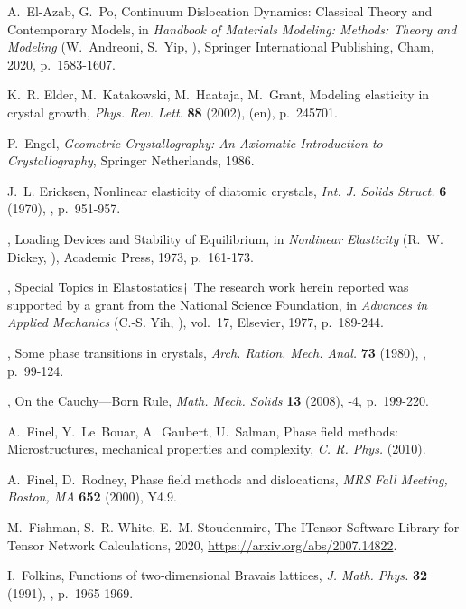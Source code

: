 \documentclass[CRPHYS,Unicode,manuscript]{cedram}
\begin{document}
\begin{thebibliography}{100}
A.~El-Azab, G.~Po, {\og Continuum Dislocation Dynamics: Classical Theory and
  Contemporary Models\fg}, in \emph{Handbook of Materials Modeling: Methods:
  Theory and Modeling} (W.~Andreoni, S.~Yip, \cdredsname), Springer
  International Publishing, Cham, 2020, p.~1583-1607.

K.~R. Elder, M.~Katakowski, M.~Haataja, M.~Grant, {\og Modeling elasticity in
  crystal growth\fg}, \emph{Phys. Rev. Lett.} \textbf{88} (2002), 
  (en), p.~245701.

P.~Engel, \emph{Geometric Crystallography: An Axiomatic Introduction to
  Crystallography}, Springer Netherlands, 1986.

J.~L. Ericksen, {\og Nonlinear elasticity of diatomic crystals\fg}, \emph{Int.
  J. Solids Struct.} \textbf{6} (1970), , p.~951-957.

\bysame , {\og Loading Devices and Stability of Equilibrium\fg}, in
  \emph{Nonlinear Elasticity} (R.~W. Dickey, \cdredname), Academic Press, 1973,
  p.~161-173.

\bysame , {\og Special Topics in {Elastostatics††The} research work herein
  reported was supported by a grant from the National Science Foundation\fg},
  in \emph{Advances in Applied Mechanics} (C.-S. Yih, \cdredname), vol.~17,
  Elsevier, 1977, p.~189-244.

\bysame , {\og Some phase transitions in crystals\fg}, \emph{Arch. Ration.
  Mech. Anal.} \textbf{73} (1980), , p.~99-124.

\bysame , {\og On the {Cauchy---Born} Rule\fg}, \emph{Math. Mech. Solids}
  \textbf{13} (2008), -4, p.~199-220.

A.~Finel, Y.~Le~Bouar, A.~Gaubert, U.~Salman, {\og Phase field methods:
  Microstructures, mechanical properties and complexity\fg}, \emph{C. R. Phys.}
  (2010).

A.~Finel, D.~Rodney, {\og Phase field methods and dislocations\fg}, \emph{MRS
  Fall Meeting, Boston, MA} \textbf{652} (2000), \cdrnumero Y4.9.

M.~Fishman, S.~R. White, E.~M. Stoudenmire, {\og The \mbox{ITensor} Software
  Library for Tensor Network Calculations\fg}, 2020,
  \url{https://arxiv.org/abs/2007.14822}.

I.~Folkins, {\og Functions of two‐dimensional Bravais lattices\fg}, \emph{J.
  Math. Phys.} \textbf{32} (1991), , p.~1965-1969.


\end{thebibliography}
\end{document}
